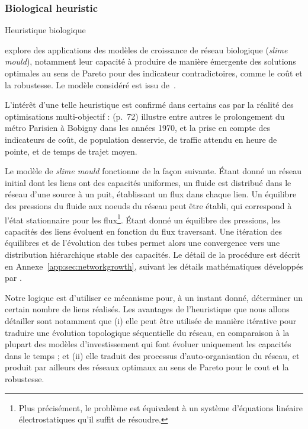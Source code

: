 \subsubsection{Biological heuristic}{Heuristique biologique}

\cite{raimbault2015labex} explore des applications des modèles de croissance de réseau biologique (\emph{slime mould}), notamment leur capacité à produire de manière émergente des solutions optimales au sens de Pareto pour des indicateur contradictoires, comme le coût et la robustesse. Le modèle considéré est issu de~\cite{tero2010rules}.

L'intérêt d'une telle heuristique est confirmé dans certains cas par la réalité des optimisations multi-objectif : \cite{padeiro:tel-00438092} (p.~72) illustre entre autres le prolongement du métro Parisien à Bobigny dans les années 1970, et la prise en compte des indicateurs de coût, de population desservie, de traffic attendu en heure de pointe, et de temps de trajet moyen.

Le modèle de \emph{slime mould} fonctionne de la façon suivante. Étant donné un réseau initial dont les liens ont des capacités uniformes, un fluide est distribué dans le réseau d'une source à un puit, établissant un flux dans chaque lien. Un équilibre des pressions du fluide aux noeuds du réseau peut être établi, qui correspond à l'état stationnaire pour les flux\footnote{Plus précisément, le problème est équivalent à un système d'équations linéaire électrostatiques qu'il suffit de résoudre.}. Étant donné un équilibre des pressions, les capacités des liens évoluent en fonction du flux traversant. Une itération des équilibres et de l'évolution des tubes permet alors une convergence vers une distribution hiérarchique stable des capacités. Le détail de la procédure est décrit en Annexe~\ref{app:sec:networkgrowth}, suivant les détails mathématiques développés par \cite{tero2007mathematical}.


Notre logique est d'utiliser ce mécanisme pour, à un instant donné, déterminer un certain nombre de liens réalisés. Les avantages de l'heuristique que nous allons détailler sont notamment que (i) elle peut être utilisée de manière itérative pour traduire une évolution topologique séquentielle du réseau, en comparaison à la plupart des modèles d'investissement qui font évoluer uniquement les capacités dans le temps ; et (ii) elle traduit des processus d'auto-organisation du réseau, et produit par ailleurs des réseaux optimaux au sens de Pareto pour le cout et la robustesse.


